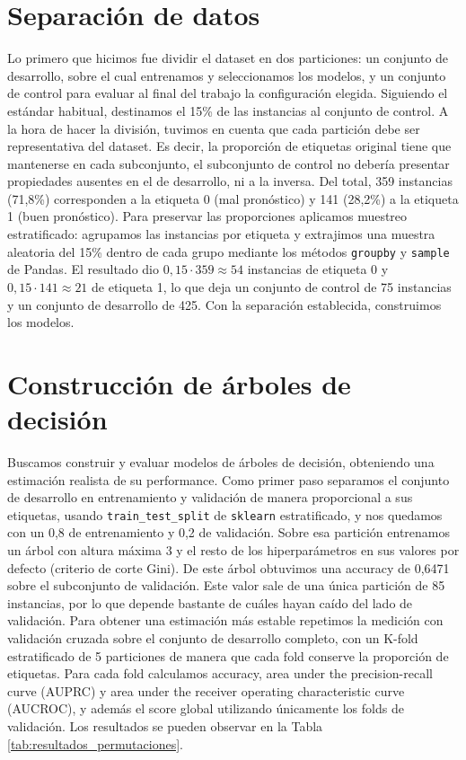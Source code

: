 \documentclass[10pt,a4paper]{article}
\begin{document}
\section{Separación de datos}
Lo primero que hicimos fue dividir el dataset en dos particiones: un conjunto de desarrollo, sobre el cual entrenamos y seleccionamos los modelos, y un conjunto de control para evaluar al final del trabajo la configuración elegida. Siguiendo el estándar habitual, destinamos el 15\% de las instancias al conjunto de control. A la hora de hacer la división, tuvimos en cuenta que cada partición debe ser representativa del dataset. Es decir, la proporción de etiquetas original tiene que mantenerse en cada subconjunto, el subconjunto de control no debería presentar propiedades ausentes en el de desarrollo, ni a la inversa. Del total, 359 instancias (71,8\%) corresponden a la etiqueta 0 (mal pronóstico) y 141 (28,2\%) a la etiqueta 1 (buen pronóstico). Para preservar las proporciones aplicamos muestreo estratificado: agrupamos las instancias por etiqueta y extrajimos una muestra aleatoria del 15\% dentro de cada grupo mediante los métodos \texttt{groupby} y \texttt{sample} de Pandas. El resultado dio $0{,}15 \cdot 359 \approx 54$ instancias de etiqueta 0 y $0{,}15 \cdot 141 \approx 21$ de etiqueta 1, lo que deja un conjunto de control de 75 instancias y un conjunto de desarrollo de 425. Con la separación establecida, construimos los modelos.

\section{Construcción de árboles de decisión}
Buscamos construir y evaluar modelos de árboles de decisión, obteniendo una estimación realista de su performance. 
Como primer paso separamos el conjunto de desarrollo en entrenamiento y validación de manera proporcional a sus etiquetas, usando \texttt{train\_test\_split} de \texttt{sklearn} estratificado, y nos quedamos con un 0,8 de entrenamiento y 0,2 de validación.
Sobre esa partición entrenamos un árbol con altura máxima 3 y el resto de los hiperparámetros en sus valores por defecto (criterio de corte Gini). De este árbol obtuvimos una accuracy de 0,6471 sobre el subconjunto de validación.
Este valor sale de una única partición de 85 instancias, por lo que depende bastante de cuáles hayan caído del lado de validación.
Para obtener una estimación más estable repetimos la medición con validación cruzada sobre el conjunto de desarrollo completo, con un K-fold estratificado de 5 particiones de manera que cada fold conserve la proporción de etiquetas.
Para cada fold calculamos accuracy, area under the precision-recall curve (AUPRC) y area under the receiver operating characteristic curve (AUCROC), y además el score global utilizando únicamente los folds de validación.
Los resultados se pueden observar en la Tabla \ref{tab:resultados_permutaciones}.
\end{document}
